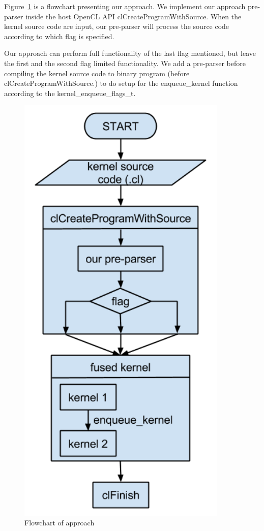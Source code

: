     Figure~\ref{fig:my_label6} is a flowchart presenting our approach. We implement our approach pre-parser inside the host OpenCL API clCreateProgramWithSource. When the kernel source code are input, our pre-parser will process the source code according to which flag is specified.

    Our approach can perform full functionality of the last flag mentioned, but leave the first and the second flag limited functionality. We add a pre-parser before compiling the kernel source code to binary program (before clCreateProgramWithSource.) to do setup for the enqueue\_kernel function according to the kernel\_enqueue\_flags\_t. 
	
\begin{figure}[hbtp]
\centering
\includegraphics[width=10cm]{img/overview-approach.png}
\caption{Flowchart of approach}
\label{fig:my_label6}
\end{figure}

